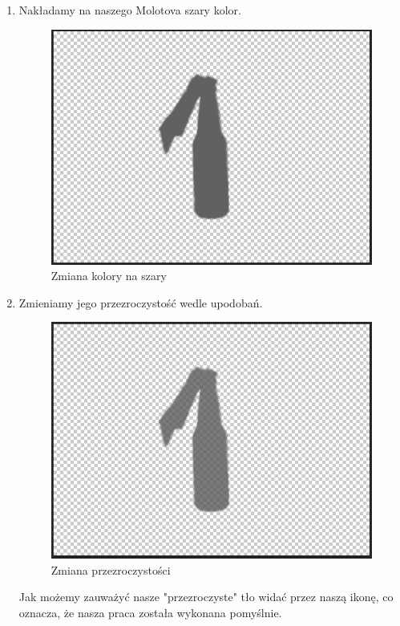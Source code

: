 \begin{enumerate}
  \item Nakładamy na naszego Molotova szary kolor.
\begin{figure}[h]
    \centering
    \includegraphics[scale=0.5]{Images/MolotovOFFgrey.jpg}
    \caption{Zmiana kolory na szary}
\end{figure}
\FloatBarrier

  \item Zmieniamy jego przezroczystość wedle upodobań.
\begin{figure}[h]
    \centering
    \includegraphics[scale=0.5]{Images/MolotovOFFgreyOpacity.jpg}
    \caption{Zmiana przezroczystości}
\end{figure}
\FloatBarrier
Jak możemy zauważyć nasze "przezroczyste" tło widać przez naszą ikonę, co oznacza, że nasza praca została wykonana pomyślnie.


\end{enumerate}

